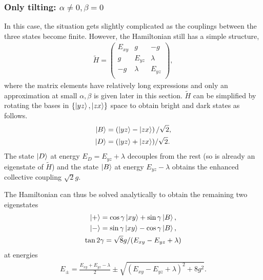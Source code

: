 \documentclass[a4paper,prb]{revtex4-1}  %
\newcommand{\com}[1]{}
\newcommand{\az}[1]{{\color{magenta}{#1}}} %
\begin{document}
\subsubsection{Only tilting: $\alpha\neq 0,\beta = 0$}
\label{sec:t2g-beta0}

In this case, the situation gets slightly complicated as
the couplings between the three states become finite. 
However, 
the Hamiltonian still has a simple structure, 
\begin{align} 
\tilde H = 
\left(
\begin{array}{ccc}
 E_{xy} & g & -g \\
 g & E_{yz} & \lambda  \\
 -g & \lambda  & E_{yz} \\
\end{array}
\right),
\end{align}
where the matrix elements have relatively long expressions and 
only an approximation at small $\alpha,\beta$ is given later in this section.
$\tilde H$ can be simplified by rotating the bases in $\{\ket{yz},\ket{zx}\}$ space
to obtain bright and dark states
as follows.
\begin{align}
\ket{B} &= \left(\ket{yz} - \ket{zx}\right)/\sqrt{2},\\
\ket{D} &=  (\ket{yz} + \ket{zx})/\sqrt{2}.
\end{align}
The state $\ket{D}$ at energy ${E_D= E_{yz}+\lambda}$ decouples 
from the rest (so is already an eigenstate of $\tilde H$) 
and the state $\ket{B}$ at energy ${E_{yz}-\lambda}$ obtains the enhanced collective coupling $\sqrt{2} g$. 
\com{
\begin{align}
\tilde H_{Bright} = 
\left(
\begin{array}{cc}
E_{xy} & \sqrt{2} g \\
\sqrt{2} g & E_{yz}-\lambda
\end{array}
\right).
\end{align}
The Hamiltonian can be solved analytically.
}
The Hamiltonian can thus be solved analytically to
obtain the remaining two
eigenstates
\begin{gather}
\ket{+} = \cos\gamma \ket{xy} + \sin\gamma \ket{B},\\
\ket{-} = \sin\gamma \ket{xy} - \cos\gamma \ket{B},\\
\tan2\gamma = \sqrt{8}g/(E_{xy}-E_{yz}+\lambda)
\end{gather}
at 
energies
\begin{gather}
E_{\pm} = \frac{E_{xy}+E_{yz}-\lambda}{2}  \pm \sqrt{(E_{xy}-E_{yz}+\lambda)^2 + 8g^2 }.
\end{gather}
\end{document}
